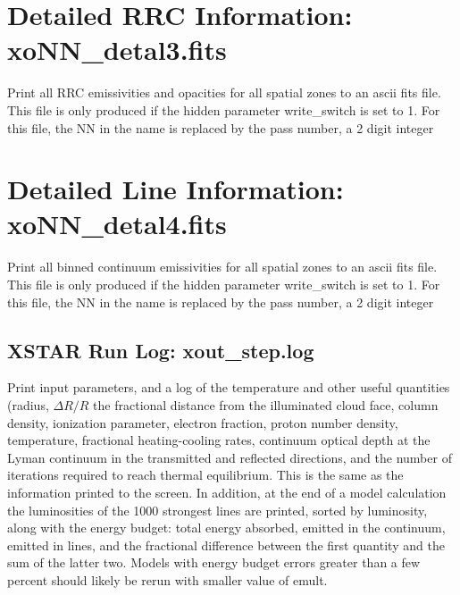 \section{Detailed RRC Information: xoNN\_detal3.fits}

Print all RRC emissivities and opacities
for all spatial zones to an ascii fits file.
This file is  only produced if the hidden 
parameter write\_switch is set to 1.
For this file, the NN in the name is replaced by the pass number,
a 2 digit integer


\section{Detailed Line Information: xoNN\_detal4.fits}

Print all binned continuum emissivities
for all spatial zones to an ascii fits file.
This file  is only produced if the hidden 
parameter write\_switch is set to 1.
For this file, the NN in the name is replaced by the pass number,
a 2 digit integer

\subsection{XSTAR Run Log: xout\_step.log} 

Print input parameters, and a log of the 
temperature and other useful quantities
(radius, $\Delta R/R$ the fractional distance from the illuminated cloud face, 
column density,  ionization parameter,
electron fraction,  proton number density, temperature, 
fractional heating-cooling rates, continuum 
optical depth at the Lyman continuum in the transmitted and reflected 
directions, and  the number of iterations required to reach thermal equilibrium.
This is the same as the information printed to 
the screen.  In addition, at the end of a model calculation the luminosities
of the 1000 strongest lines are printed, sorted by luminosity, along with the 
energy budget: total energy absorbed, emitted in the continuum, emitted in lines, and 
the fractional difference between the first quantity and the sum of the latter two. 
Models with energy budget errors greater than a few percent should likely be rerun 
with smaller value of emult.





